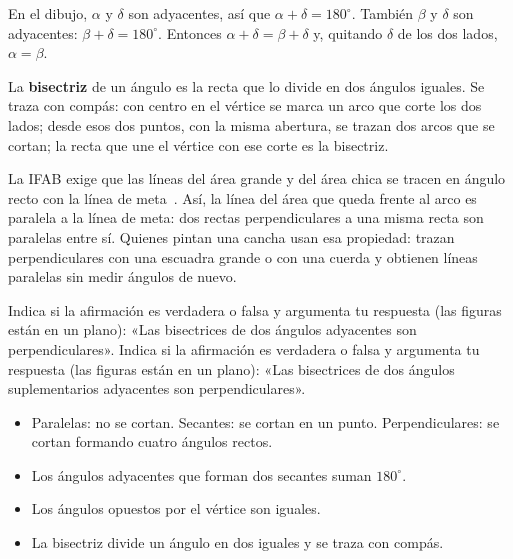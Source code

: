 \documentclass[11pt]{article}
\begin{document}
\begin{teorema}
En el dibujo, $\alpha$ y $\delta$ son adyacentes, así que $\alpha + \delta = 180^\circ$. También
$\beta$ y $\delta$ son adyacentes: $\beta + \delta = 180^\circ$. Entonces
$\alpha + \delta = \beta + \delta$ y, quitando $\delta$ de los dos lados, $\alpha = \beta$.
\end{teorema}

La \textbf{bisectriz} de un ángulo es la recta que lo divide en dos ángulos iguales. Se traza
con compás: con centro en el vértice se marca un arco que corte los dos lados; desde esos dos
puntos, con la misma abertura, se trazan dos arcos que se cortan; la recta que une el vértice
con ese corte es la bisectriz.

\begin{aplicacion}
La IFAB exige que las líneas del área grande y del área chica se tracen en ángulo recto con la
línea de meta~\cite{ifab}. Así, la línea del área que queda frente al arco es paralela a la
línea de meta: dos rectas perpendiculares a una misma recta son paralelas entre sí. Quienes
pintan una cancha usan esa propiedad: trazan perpendiculares con una escuadra grande o con una
cuerda y obtienen líneas paralelas sin medir ángulos de nuevo.
\end{aplicacion}

\begin{preguntas}
\pregunta Indica si la afirmación es verdadera o falsa y argumenta tu respuesta (las figuras
están en un plano): «Las bisectrices de dos ángulos adyacentes son perpendiculares».
\pregunta Indica si la afirmación es verdadera o falsa y argumenta tu respuesta (las figuras
están en un plano): «Las bisectrices de dos ángulos suplementarios adyacentes son
perpendiculares».
\end{preguntas}

\begin{resumen}
\begin{itemize}
  \item Paralelas: no se cortan. Secantes: se cortan en un punto. Perpendiculares: se cortan
        formando cuatro ángulos rectos.
  \item Los ángulos adyacentes que forman dos secantes suman $180^\circ$.
  \item Los ángulos opuestos por el vértice son iguales.
  \item La bisectriz divide un ángulo en dos iguales y se traza con compás.
\end{itemize}
\end{resumen}
\end{document}
